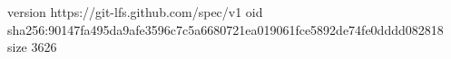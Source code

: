 version https://git-lfs.github.com/spec/v1
oid sha256:90147fa495da9afe3596c7c5a6680721ea019061fce5892de74fe0dddd082818
size 3626
